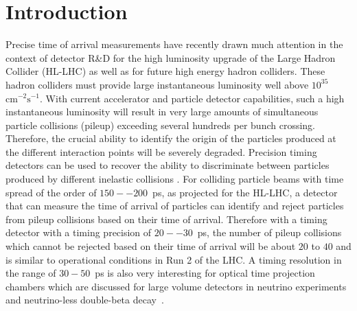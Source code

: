 \section{Introduction}
\label{sec:introduction}


Precise time of arrival measurements have recently drawn much attention in the
context of detector R\&D for the high luminosity upgrade of the Large Hadron
Collider (HL-LHC) as well as for future high energy hadron colliders. These
hadron colliders must provide large instantaneous luminosity well above
$10^{35}$~$\mathrm{cm}^{-2}\mathrm{s}^{-1}$. With current accelerator and
particle detector capabilities, such a high instantaneous luminosity will result
in very large amounts of simultaneous particle collisions (pileup) exceeding
several hundreds per bunch crossing. Therefore, the crucial ability to identify
the origin of the particles produced at the different interaction points will be
severely degraded. Precision timing detectors can be used to recover the ability
to discriminate between particles produced by different inelastic collisions
\cite{adielba}. For colliding particle beams with time spread of the order of
$150--200$~ps, as projected for the HL-LHC, a detector that can measure the time of
arrival of particles can identify and reject particles from pileup collisions
based on their time of arrival. Therefore with a timing detector with a timing
precision of $20--30$~ps, the number of pileup collisions which cannot be rejected
based on their time of arrival will be about $20$ to $40$ and is similar to
operational conditions in Run 2 of the LHC. A timing
resolution in the range of $30-50$~ps is also very interesting for
optical time projection chambers which are discussed for large volume detectors
in neutrino experiments and neutrino-less double-beta
decay~\cite{Aberle:2013jba, otpc}. 


